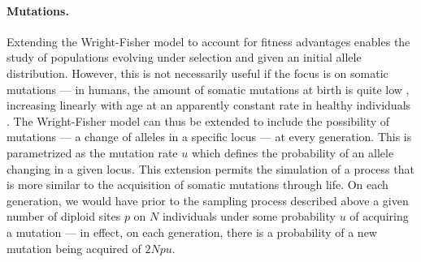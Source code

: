 \paragraph{Mutations.} Extending the Wright-Fisher model to account for fitness advantages enables the study of populations evolving under selection and given an initial allele distribution. However, this is not necessarily useful if the focus is on somatic mutations --- in humans, the amount of somatic mutations at birth is quite low \cite{SpencerChapman_2021_gjz4x4,Mitchell2021-zl}, increasing linearly with age at an apparently constant rate in healthy individuals \cite{Abascal_2021_gjvqfm,Mitchell2021-zl}. The Wright-Fisher model can thus be extended to include the possibility of mutations --- a change of alleles in a specific locus --- at every generation. This is parametrized as the mutation rate $u$ which defines the probability of an allele changing in a given locus. This extension permits the simulation of a process that is more similar to the acquisition of somatic mutations through life. On each generation, we would have prior to the sampling process described above a given number of diploid sites $p$ on $N$ individuals under some probability $u$ of acquiring a mutation --- in effect, on each generation, there is a probability of a new mutation being acquired of $2Npu$.

